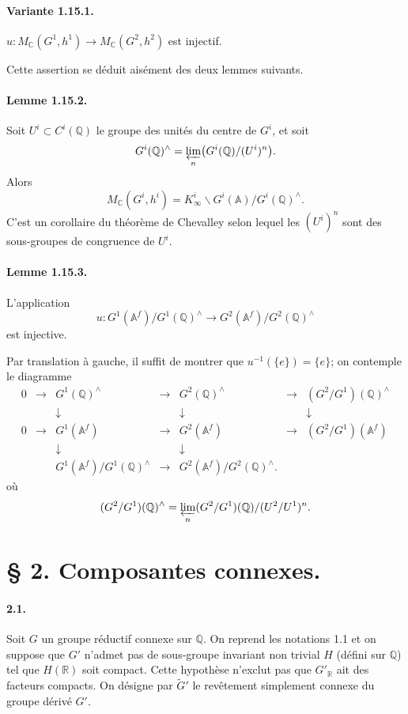 \documentclass[10pt]{article}
\newcommand{\A}{\mathbb A}
\newcommand{\Af}{\mathbb A^f}
\newcommand{\C}{\mathbb C}
\newcommand{\Q}{\mathbb Q}
\newcommand{\R}{\mathbb R}
\newcommand{\limproj}{\varprojlim}
\newcommand{\MC}{M_{\C}}
\begin{document}
\paragraph{Variante 1.15.1.} $u:\MC(G^1,h^1)\longrightarrow\MC(G^2,h^2)$ est injectif.



Cette assertion se déduit aisément des deux lemmes suivants.

\paragraph{Lemme 1.15.2.} Soit $U^i\subset C^i(\Q)$ le groupe des unités du centre de $G^i$, et soit
\[
G^i(\Q)^\wedge=\limproj_n\bigl(G^i(\Q)/(U^i)^n\bigr).
\]
Alors
\[
\MC(G^i,h^i)=K^i_\infty\backslash G^i(\A)/G^i(\Q)^\wedge .
\]
C'est un corollaire du théorème de Chevalley selon lequel les $(U^i)^n$ sont des sous-groupes de congruence de $U^i$.

\paragraph{Lemme 1.15.3.} L'application
\[
u:G^1(\Af)/G^1(\Q)^\wedge\longrightarrow G^2(\Af)/G^2(\Q)^\wedge
\]
est injective.

Par translation à gauche, il suffit de montrer que $u^{-1}(\{e\})=\{e\}$; on contemple le diagramme
\[
\begin{array}{ccccccccc}
0&\longrightarrow&G^1(\Q)^\wedge&\longrightarrow&G^2(\Q)^\wedge&\longrightarrow&(G^2/G^1)(\Q)^\wedge\\
&&\downarrow&&\downarrow&&\downarrow\!\\
0&\longrightarrow&G^1(\Af)&\longrightarrow&G^2(\Af)&\longrightarrow&(G^2/G^1)(\Af)\\
&&\downarrow&&\downarrow&&\\
&&G^1(\Af)/G^1(\Q)^\wedge&\longrightarrow&G^2(\Af)/G^2(\Q)^\wedge.&&
\end{array}
\]
où
\[
(G^2/G^1)(\Q)^\wedge=\limproj_n (G^2/G^1)(\Q)/(U^2/U^1)^n .
\]

\section*{§ 2. Composantes connexes.}

\paragraph{2.1.} Soit $G$ un groupe réductif connexe sur $\Q$. On reprend les notations 1.1 et on suppose que $G'$ n'admet pas de sous-groupe invariant non trivial $H$ (défini sur $\Q$) tel que $H(\R)$ soit compact. Cette hypothèse n'exclut pas que $G'_\R$ ait des facteurs compacts. On désigne par $\widetilde G'$ le revêtement simplement connexe du groupe dérivé $G'$.
\end{document}
